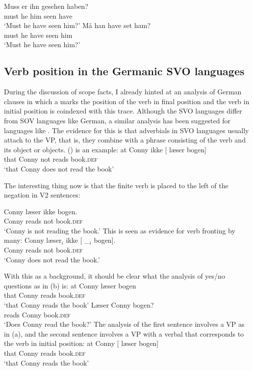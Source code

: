 \eal
\ex 
\gll Muss er ihn gesehen haben?\\
     must he him seen have\\\german
\glt `Must he have seen him?'
\ex 
\gll Må han have set ham?\\
     must he have seen him\\\danish
\glt `Must he have seen him?'
\zl
{}



\subsection{Verb position in the Germanic SVO languages}
\label{sec-danish-verb-movement}\label{sec-Germanic-SVO-verb-position}

During the discussion of scope facts, I already hinted at an analysis of German clauses in which a  marks the
position of the verb in final position and the verb in initial position is coindexed with this
trace. Although the SVO languages differ from SOV languages like German, a similar analysis has been suggested for languages
like . The evidence for this is that adverbials in SVO languages usually attach to the VP,
that is, they combine with a phrase consisting of the verb and its object or objects. () is
an example:
\ea
\gll  at   Conny ikke [ læser bogen]\\
      that Conny not      {}        reads          book.\textsc{def}\\\danish
\glt `that Conny does not read the book'
\z

\noindent
The interesting thing now is that the finite verb is placed to the left of the negation in V2 sentences:

\ea
\gll  Conny læser ikke bogen.\\
       Conny reads   not  book.\textsc{def}\\\danish
\glt `Conny is not reading the book.'
\z
This is seen as evidence for verb fronting by many:
\ea
\gll  Conny læser$_i$ ikke [ \_$_i$ bogen].\\
      Conny reads      not  {} {}    book.\textsc{def}\\\danish
\glt `Conny does not read the book.'
\z
\nocite{KS2002a}

\noindent
With this as a background, it should be clear what the analysis of yes/no questions as in (b) is:
\eal
\ex
\gll at Conny læser bogen\\
     that Conny reads book.\textsc{def}\\\danish
\glt `that Conny reads the book'
\ex\label{ex-laeser-jens-bogen}
\gll Læser Conny bogen?\\
     reads Conny book.\textsc{def}\\
\glt `Does Conny read the book?'
\zl
The analysis of the first sentence involves a VP as in (a), and the second sentence involves a
VP with a verbal  that corresponds to the verb in initial position:
\eal
\ex
\gll at Conny [ læser bogen]\\
     that Conny {} reads book.\textsc{def}\\\danish
\glt `that Conny reads the book'

